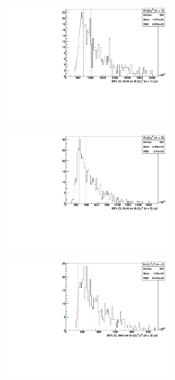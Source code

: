 \documentclass[herrin-thesis.tex]{subfiles}
\begin{document}
\begin{figure}[tbp]
\centering
	\begin{subfigure}[c]{0.48\textwidth}
	\centering
	\includegraphics[width=\textwidth]{./plots/analysis_bb0nX1_sensitivity.pdf}
	\end{subfigure}\hfill%
	\begin{subfigure}[c]{0.48\textwidth}
	\centering
	\includegraphics[width=\textwidth]{./plots/analysis_bb0nX2_sensitivity.pdf}
	\end{subfigure}
	\begin{subfigure}[c]{0.48\textwidth}
	\centering
	\includegraphics[width=\textwidth]{./plots/analysis_bb0nX3_sensitivity.pdf}

\end{subfigure}
\end{figure}
\end{document}
